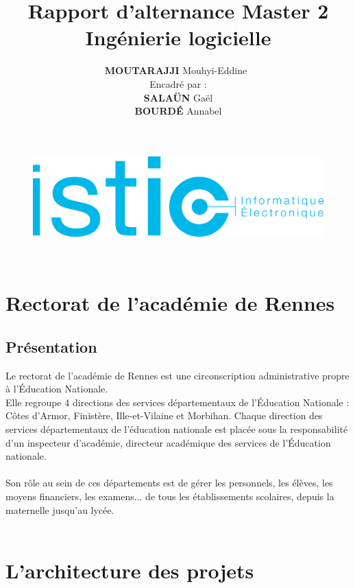 \documentclass[a4paper]{article}
\title{\textbf{Rapport d'alternance Master 2 Ingénierie logicielle\\ }}
\author{\textbf{MOUTARAJJI} Mouhyi-Eddine\
\\Encadré par :\\\textbf{SALAÜN} Gaël \\\textbf{BOURDÉ} Annabel }
\begin{document}
\date{}

\begin{figure}
\centering
\includegraphics[width=1.1\textwidth]{diagrammes/logoisticfr_0.png}
\end{figure}


\maketitle

\newpage

\tableofcontents
~
\newpage



\section{Rectorat de l’académie de Rennes} 

\subsection{Présentation}

Le rectorat de l'académie de Rennes est une circonscription administrative propre à
l’Éducation Nationale.\\
Elle regroupe 4 directions des services départementaux de l'Éducation Nationale : 
Côtes d'Armor, Finistère, Ille-et-Vilaine et Morbihan. Chaque direction des services départementaux de l'éducation nationale est placée sous la responsabilité d'un inspecteur d'académie, directeur académique des services de l'Éducation nationale.\\\\
Son rôle au sein de ces départements est de gérer les personnels, les élèves, les moyens financiers, les examens... de tous les établissements scolaires, depuis la maternelle jusqu'au lycée.\\\\

\section{L'architecture des projets}
\end{document}
